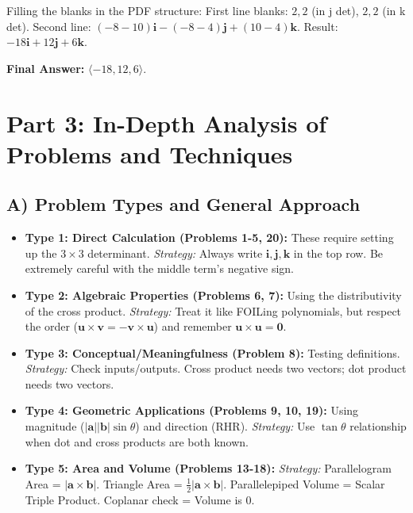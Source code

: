 \documentclass[11pt]{article}
\renewcommand{\vec}[1]{\mathbf{#1}}
\newcommand{\ihat}{\mathbf{i}}
\newcommand{\jhat}{\mathbf{j}}
\newcommand{\khat}{\mathbf{k}}
\begin{document}
Filling the blanks in the PDF structure:
First line blanks: $2, 2$ (in j det), $2, 2$ (in k det).
Second line: $(-8 - 10)\ihat - (-8 - 4)\jhat + (10 - 4)\khat$.
Result: $-18\ihat + 12\jhat + 6\khat$.

\textbf{Final Answer:} $\langle -18, 12, 6 \rangle$.

\newpage

\section{Part 3: In-Depth Analysis of Problems and Techniques}

\subsection{A) Problem Types and General Approach}
\begin{itemize}
    \item \textbf{Type 1: Direct Calculation (Problems 1-5, 20):} These require setting up the $3 \times 3$ determinant. \textit{Strategy:} Always write $\ihat, \jhat, \khat$ in the top row. Be extremely careful with the middle term's negative sign.
    \item \textbf{Type 2: Algebraic Properties (Problems 6, 7):} Using the distributivity of the cross product. \textit{Strategy:} Treat it like FOILing polynomials, but respect the order ($\vec{u} \times \vec{v} = -\vec{v} \times \vec{u}$) and remember $\vec{u} \times \vec{u} = \vec{0}$.
    \item \textbf{Type 3: Conceptual/Meaningfulness (Problem 8):} Testing definitions. \textit{Strategy:} Check inputs/outputs. Cross product needs two vectors; dot product needs two vectors.
    \item \textbf{Type 4: Geometric Applications (Problems 9, 10, 19):} Using magnitude ($|\vec{a}||\vec{b}|\sin \theta$) and direction (RHR). \textit{Strategy:} Use $\tan \theta$ relationship when dot and cross products are both known.
    \item \textbf{Type 5: Area and Volume (Problems 13-18):} \textit{Strategy:} Parallelogram Area = $|\vec{a} \times \vec{b}|$. Triangle Area = $\frac{1}{2}|\vec{a} \times \vec{b}|$. Parallelepiped Volume = Scalar Triple Product. Coplanar check = Volume is 0.
\end{itemize}
\end{document}
